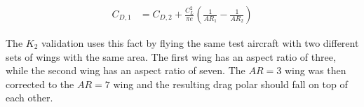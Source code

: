 \begin{align}
C_{D,1} &= C_{D,2} + \frac{C^2_L}{\pi e}(\frac{1}{AR_1} - \frac{1}{AR_2})
\end{align}

The $K_2$ validation uses this fact by flying the same test aircraft with two different sets of wings with the same area. The first wing has an aspect ratio of three, while the second wing has an aspect ratio of seven. The $AR = 3$ wing was then corrected to the $AR = 7$ wing and the resulting drag polar should fall on top of each other.